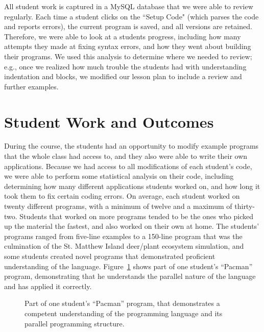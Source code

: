 \documentclass{sig-alternate}
\newcommand{\INDSTATE}[1][1]{\STATE\hspace{#1\algorithmicindent}}
\begin{document}
All student work is captured in a MySQL database that we were able to review regularly.  Each time
a student clicks on the ``Setup Code" (which parses the code and reports errors), the current
program is saved, and all versions are retained.  Therefore, we were able to look at a students 
progress, including how many attempts they made at fixing syntax errors, and how they went about
building their programs.  We used this analysis to determine where we needed to review; e.g.,
once we realized how much trouble the students had with understanding indentation and blocks, we
modified our lesson plan to include a review and further examples.

\section{Student Work and Outcomes}
During the course, the students had an opportunity to modify example programs that the whole
class had access to, and they also were able to write their own applications.  Because we 
had access to all modifications of each student's code, we were able to perform some
statistical analysis on their code, including determining how many different applications 
students worked on, and how long it took them to fix certain coding errors.  On average, 
each student worked on twenty different programs, with a minimum of twelve and a maximum
of thirty-two.  Students that worked on more programs tended to be the ones who picked up
the material the fastest, and also worked on their own at home.  The students' programs ranged 
from five-line examples to a 150-line program that 
was the culmination of the St. Matthew Island deer/plant ecosystem simulation, and some students
created novel programs that demonstrated proficient understanding of the language.  
Figure~\ref{fig:pacmanProgram} shows part of one student's ``Pacman'' program, demonstrating that
he understands the parallel nature of the language and has applied it correctly.

\begin{figure}
\begin{algorithmic}[1]
  \INDSTATE{for each pacman}
    \INDSTATE[2]{do in any order}
      \INDSTATE[3]{move the pacman's position a random number between 10 and 50 right}
      \INDSTATE[3]{move the pacman's position a random number between 10 and 50 left}
      \INDSTATE[3]{move the pacman's position a random number between 10 and 50 up}
      \INDSTATE[3]{move the pacman's position a random number between 10 and 50 down}

  \INDSTATE{destroy the pacman}
\end{algorithmic} 
\caption{Part of one student's ``Pacman'' program, that demonstrates a competent understanding
of the programming language and its parallel programming structure.}
\label{fig:pacmanProgram} 
\end{figure}
\end{document}
